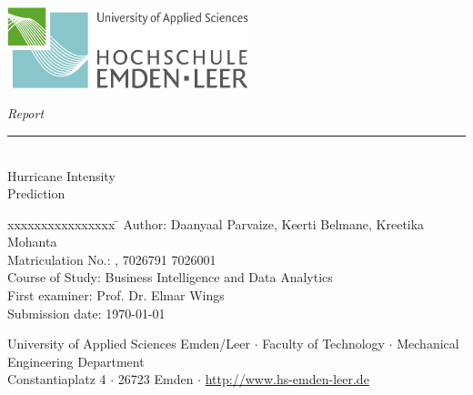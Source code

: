 %
%

\begin{titlepage}
    
    \begin{flushleft} 
        \includegraphics[width=7cm]{General/technik.jpg}
    \end{flushleft} 
    
    \begin{flushright}
        \vspace{2cm}
        \LARGE \textsl{Report}\\
        \rule{0.6\textwidth}{0.4pt} ~\\
        \vspace{0.5cm}
        \textsf{\LARGE Hurricane Intensity}\\
        \textsf{\LARGE Prediction}
    \end{flushright}
    
    \vspace{3cm}
    \large
    \begin{tabbing}
        xxxxxxxxxxxxxxxx \= \kill
        Author: \> Daanyaal Parvaize, Keerti Belmane, Kreetika Mohanta \\
        Matriculation No.: , 7026791
        7026001
         \\
        Course of Study: \> Business Intelligence and Data Analytics \\ [0.5cm]
        First examiner: \> Prof. Dr. Elmar Wings \\
        Submission date: \> \today \\
    \end{tabbing}
    
    \vspace{3cm}
    \small
    \begin{center}
        University of Applied Sciences Emden/Leer $\cdot$ 
        Faculty of Technology $\cdot$ 
        Mechanical Engineering Department \\
        Constantiaplatz 4 $\cdot$ 
        26723 Emden $\cdot$ 
        \url{http://www.hs-emden-leer.de}
    \end{center}
    
\end{titlepage}
